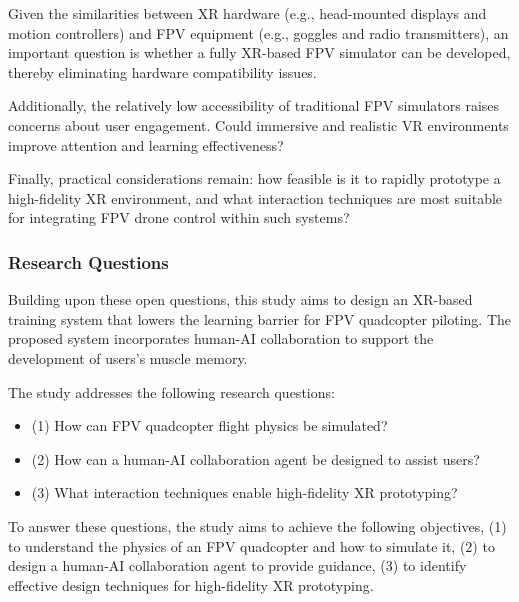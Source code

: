 Given the similarities between XR hardware (e.g., head-mounted displays and motion controllers) and FPV equipment (e.g., goggles and radio transmitters), an important question is whether a fully XR-based FPV simulator can be developed, thereby eliminating hardware compatibility issues.

Additionally, the relatively low accessibility of traditional FPV simulators raises concerns about user engagement. Could immersive and realistic VR environments improve attention and learning effectiveness?

Finally, practical considerations remain: how feasible is it to rapidly prototype a high-fidelity XR environment, and what interaction techniques are most suitable for integrating FPV drone control within such systems?

\subsubsection{Research Questions}

Building upon these open questions, this study aims to design an XR-based training system that lowers the learning barrier for FPV quadcopter piloting. The proposed system incorporates human-AI collaboration to support the development of users's muscle memory.

The study addresses the following research questions:

\begin{itemize}
\item[] (1) How can FPV quadcopter flight physics be simulated?
\item[] (2) How can a human-AI collaboration agent be designed to assist users?
\item[] (3) What interaction techniques enable high-fidelity XR prototyping?
\end{itemize}

To answer these questions, the study aims to achieve the following objectives, (1) to understand the physics of an FPV quadcopter and how to simulate it, (2) to design a human-AI collaboration agent to provide guidance, (3) to identify effective design techniques for high-fidelity XR prototyping.
